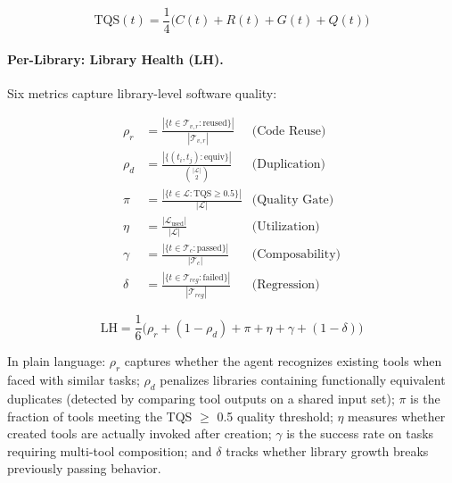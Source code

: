 \documentclass[sigplan,nonacm,natbib=false]{acmart}
\begin{document}
\begin{equation}
\text{TQS}(t) = \frac{1}{4}\bigl(C(t) + R(t) + G(t) + Q(t)\bigr)
\end{equation}

\paragraph{Per-Library: Library Health (LH).}
Six metrics capture library-level software quality:

\begin{align}
\rho_r &= \frac{|\{t \in \mathcal{T}_{v,r} : \text{reused}\}|}{|\mathcal{T}_{v,r}|} & \text{(Code Reuse)} \\[2pt]
\rho_d &= \frac{|\{(t_i,t_j) : \text{equiv}\}|}{\binom{|\mathcal{L}|}{2}} & \text{(Duplication)} \\[2pt]
\pi &= \frac{|\{t \in \mathcal{L} : \text{TQS} \geq 0.5\}|}{|\mathcal{L}|} & \text{(Quality Gate)} \\[2pt]
\eta &= \frac{|\mathcal{L}_{\text{used}}|}{|\mathcal{L}|} & \text{(Utilization)} \\[2pt]
\gamma &= \frac{|\{t \in \mathcal{T}_c : \text{passed}\}|}{|\mathcal{T}_c|} & \text{(Composability)} \\[2pt]
\delta &= \frac{|\{t \in \mathcal{T}_{reg} : \text{failed}\}|}{|\mathcal{T}_{reg}|} & \text{(Regression)}
\end{align}

\begin{equation}
\text{LH} = \frac{1}{6}\bigl(\rho_r + (1{-}\rho_d) + \pi + \eta + \gamma + (1{-}\delta)\bigr)
\end{equation}

In plain language: $\rho_r$ captures whether the agent recognizes existing tools when faced with similar tasks; $\rho_d$ penalizes libraries containing functionally equivalent duplicates (detected by comparing tool outputs on a shared input set); $\pi$ is the fraction of tools meeting the TQS $\geq$ 0.5 quality threshold; $\eta$ measures whether created tools are actually invoked after creation; $\gamma$ is the success rate on tasks requiring multi-tool composition; and $\delta$ tracks whether library growth breaks previously passing behavior.
\end{document}
